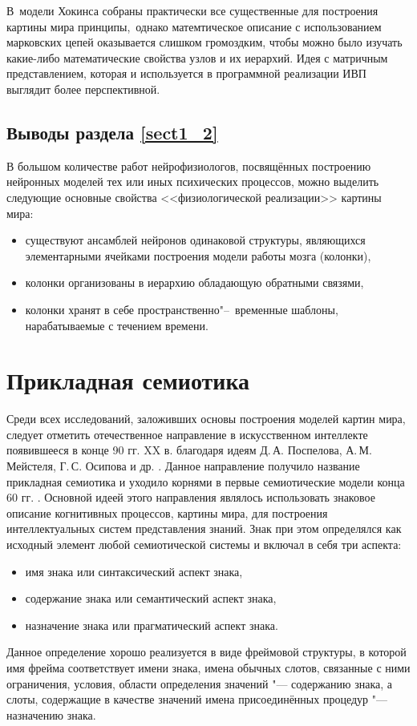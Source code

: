 В~модели Хокинса собраны практически все существенные для построения картины мира принципы,~однако матемтическое описание с использованием марковских цепей оказывается слишком громоздким, чтобы можно было изучать какие-либо математические свойства узлов и их иерархий. Идея с матричным представлением, которая и используется в программной реализации ИВП выглядит более перспективной.

\subsection{Выводы раздела \ref{sect1_2}}

В большом количестве работ нейрофизиологов, посвящённых построению нейронных моделей тех или иных психических процессов, можно выделить следующие основные свойства <<физиологической реализации>> картины мира:
\begin{itemize}
	\item существуют ансамблей нейронов одинаковой структуры, являющихся элементарными ячейками построения модели работы мозга (колонки),
	\item колонки организованы в иерархию обладающую обратными связями,
	\item колонки хранят в себе пространственно"--~временные шаблоны, нарабатываемые с течением времени.
\end{itemize}

\section{Прикладная семиотика} \label{sect1_3}

Среди всех исследований, заложивших основы построения моделей картин мира, следует отметить отечественное направление в искусственном интеллекте появившееся в конце 90 гг. XX в. благодаря идеям Д.\,А. Поспелова, А.\,М. Мейстеля, Г.\,С. Осипова и др. \cite{Osipov1995,Pospelov1996,Ehrlich1997,Osipov1999,Osipov2000b,Osipov2002a}. Данное направление получило название прикладная семиотика и уходило корнями в первые семиотические модели конца 60 гг. \cite{Pospelov1976}. Основной идеей этого направления являлось использовать знаковое описание когнитивных процессов, картины мира, для построения интеллектуальных систем представления знаний. Знак при этом определялся как исходный элемент любой семиотической системы и включал в себя три аспекта:
\begin{itemize}
	\item имя знака или синтаксический аспект знака,
	\item содержание знака или семантический аспект знака,
	\item назначение знака или прагматический аспект знака.
\end{itemize}
Данное определение хорошо реализуется в виде фреймовой структуры, в которой имя фрейма соответствует имени знака, имена обычных слотов, связанные с ними ограничения, условия, области определения значений "--- содержанию знака, а слоты, содержащие в качестве значений имена присоединённых процедур "--- назначению знака.

